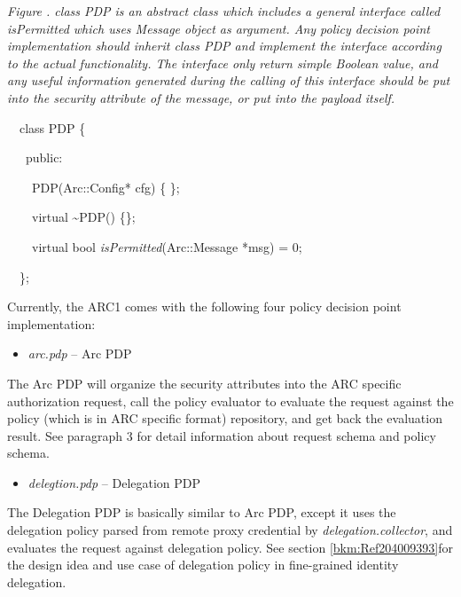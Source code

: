 \documentclass[a4paper]{article}
\newcommand\liststyleWWviiiNumxiii{%
\renewcommand\labelitemi{[F0B7?]}
\renewcommand\labelitemii{[F0B7?]}
\renewcommand\labelitemiii{[F0B7?]}
\renewcommand\labelitemiv{[F0B7?]}
}
\newcounter{Figure}
\renewcommand\theFigure{\arabic{Figure}}
\begin{document}
{\centering{}\itshape\color{black}
Figure \stepcounter{Figure}{\theFigure}. class PDP is an abstract class
which includes a general interface called isPermitted which uses
Message object as argument. Any policy decision point implementation
should inherit class PDP and implement the interface according to the
actual functionality. The interface only return simple Boolean value,
and any useful information generated during the calling of this
interface should be put into the security attribute of the message, or
put into the payload itself.
\par}

\begin{center}
\begin{minipage}{3.8752in}
{\color{black}
\ \ class PDP \{}

{\upshape\color{black}
\ \ \ public:}

{\upshape\color{black}
\ \ \ \ PDP(Arc::Config* cfg) \{ \};}

{\upshape\color{black}
\ \ \ \ virtual \~{}PDP() \{\};}

{\upshape\color{black}
\ \ \ \ virtual bool \textit{isPermitted}(Arc::Message *msg) = 0;}

{\color{black}
\ \ \};}
\end{minipage}
\end{center}
{\upshape\color{black}
Currently, the ARC1 comes with the following four policy decision point
implementation: }

\liststyleWWviiiNumxiii
\begin{itemize}
\item {\color{black}
\textit{arc.pdp }{}-- Arc PDP}
\end{itemize}
{\upshape\color{black}
The Arc PDP will organize the security attributes into the ARC specific
authorization request, call the policy evaluator to evaluate the
request against the policy (which is in ARC specific format)
repository, and get back the evaluation result. See paragraph 3 for
detail information about request schema and policy schema.}

\liststyleWWviiiNumxiii
\begin{itemize}
\item {\color{black}
\textit{delegtion.pdp} -- Delegation PDP}
\end{itemize}
{\upshape\color{black}
The Delegation PDP is basically similar to Arc PDP, except it uses the
delegation policy parsed from remote proxy credential by
\textit{delegation.collector}, and evaluates the request against
delegation policy. See section \ref{bkm:Ref204009393}for the design
idea and use case of delegation policy in fine-grained identity
delegation.}
\end{document}
